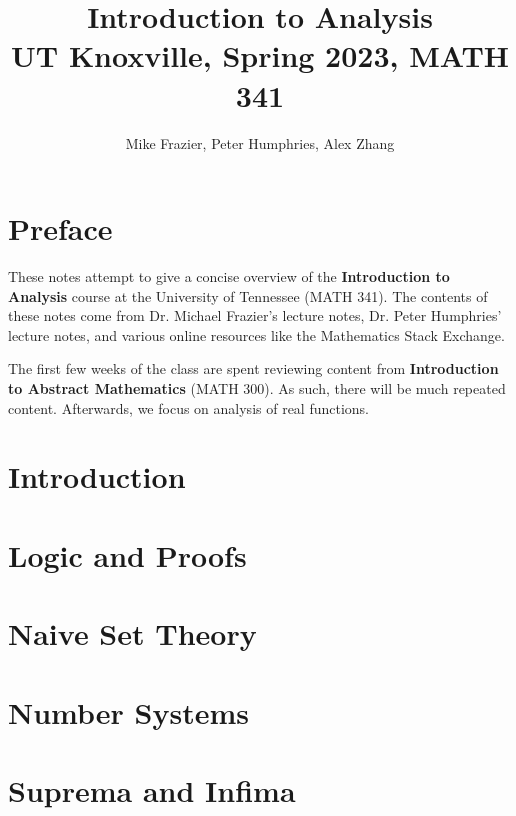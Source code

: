 \documentclass[12pt]{report}
\title{\textbf{Introduction to Analysis}\\
\large UT Knoxville, Spring 2023, MATH 341}
\author{Mike Frazier, Peter Humphries, Alex Zhang}
\begin{document}
\maketitle
\tableofcontents

\chapter*{Preface}
These notes attempt to give a concise overview of the \textbf{Introduction to Analysis} course at the University of Tennessee (MATH 341). The contents of these notes come from Dr. Michael Frazier's lecture notes, Dr. Peter Humphries' lecture notes, and various online resources like the Mathematics Stack Exchange.

The first few weeks of the class are spent reviewing content from \textbf{Introduction to Abstract Mathematics} (MATH 300). As such, there will be much repeated content. Afterwards, we focus on analysis of real functions.

\chapter{Introduction}


\chapter{Logic and Proofs}


\chapter{Naive Set Theory}


\chapter{Number Systems}


\chapter{Suprema and Infima}





\amzindex
\end{document}
